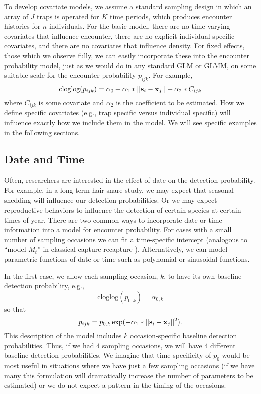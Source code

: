 To develop covariate models, we assume a standard sampling design in which an
array of $J$ traps is operated for $K$ time periods, which produces
encounter histories for $n$ individuals.  For the basic model, there
are no time-varying covariates that influence encounter, there are no
explicit individual-specific covariates, and there are no covariates
that influence density.  For fixed effects, those which we observe
fully, we can easily incorporate these into the encounter probability
model, just as we would do in any standard GLM or GLMM, on some
suitable scale for the encounter probability $p_{ijk}$. For example,
\[
\mbox{cloglog}(p_{ijk}) = \alpha_0 + \alpha_1*||{\bf s}_{i}-{\bf x}_{j}|| +
\alpha_2*C_{ijk}
\]
where $C_{ijk}$ is some covariate and
$\alpha_2$ is the coefficient to be estimated.
 How we define specific covariates (e.g., trap specific
versus individual specific) will influence exactly how we include them
in the model. We will see specific examples in the following sections.  





\subsection{Date and Time}

Often, researchers are interested in the effect of date on the detection
probability. For example, in a long term hair snare study, we may
expect that seasonal shedding will influence our detection
probabilities.  Or we may expect reproductive behaviors to influence
the detection of certain species at certain times of year.  There are
two common ways to incorporate date or time information into a model
for encounter probability. For cases with a small number of sampling
occasions we can fit a time-specific intercept (analogous to ``model
$M_{t}$'' in classical capture-recapture
\citep{otis_etal:1978}). Alternatively, we can model parametric
functions of date or time such as polynomial or sinusoidal functions.

In the first case, 
 we allow each sampling
occasion, $k$, to have its own baseline detection probability, e.g.,
\[
\mbox{cloglog}(p_{0,k}) = \alpha_{0,k}
\]
so that
\[
p_{ijk} = p_{0,k} \exp(- \alpha_1*||{\bf s}_{i}-{\bf x}_{j}||^2).
\]
This
description of the model includes  $k$ occasion-specific baseline detection
probabilities.  Thus, if we had 4 sampling occasions, we will have 4
different baseline detection probabilities.  We imagine that
time-specificity of $p_{0}$ would be most useful 
in situations where we have just a few sampling
occasions (if we have many this formulation will dramatically increase the number of parameters to be estimated) or we do not expect a pattern in the timing of the
occasions.

